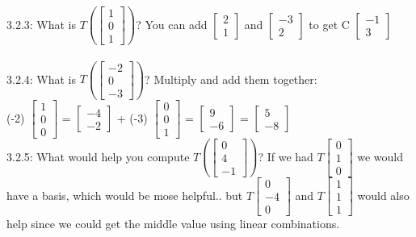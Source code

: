 \documentclass{article}
\begin{document}
3.2.3: What is $T\left(\left[\begin{array}{c} 1 \\ 0 \\ 1 \end{array}\right]\right)$? You can add $\begin{bmatrix} 2\\1 \end{bmatrix}$ and $\begin{bmatrix} -3\\2 \end{bmatrix}$ to get C $\begin{bmatrix} -1\\3 \end{bmatrix}$  \\
\\
3.2.4: What is $T\left(\left[\begin{array}{c} -2 \\ 0 \\ -3 \end{array}\right]\right)$? Multiply and add them together:\\
(-2) $\begin{bmatrix} 1\\0\\0  \end{bmatrix}$ = $\begin{bmatrix} -4\\-2 \end{bmatrix}$ + 
(-3) $\begin{bmatrix} 0\\0\\1  \end{bmatrix}$ = $\begin{bmatrix} 9\\-6 \end{bmatrix}$ =
$\begin{bmatrix} 5\\-8 \end{bmatrix}$
\\
3.2.5: What would help you compute $T\left(\left[\begin{array}{c} 0 \\ 4 \\ -1 \end{array}\right]\right)$? If we had $T \begin{bmatrix} 0\\1\\0 \end{bmatrix}$ we would have a basis, which would be mose helpful.. but $T \begin{bmatrix} 0\\-4\\0 \end{bmatrix}$ and $T \begin{bmatrix} 1\\1\\1 \end{bmatrix}$ would also help since we could get the middle value using linear combinations.\\
\end{document}
